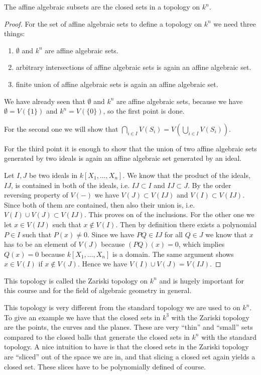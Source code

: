 \begin{proposition}
The affine algebraic subsets are the closed sets in a topology on $k^n$. 
\end{proposition}

\begin{proof}
For the set of affine algebraic sets to define a topology on $k^n$ we need three things:
\begin{enumerate}
    \item $\emptyset$ and $k^n$ are affine algebraic sets.
    \item arbitrary intersections of affine algebraic sets is again an affine algebraic set.
    \item finite union of affine algebraic sets is again an affine algebraic set. 
\end{enumerate}

We have already seen that $\emptyset$ and $k^n$ are affine algebraic sets, because we have $\emptyset = V(\{ 1\})$ and $k^n=V(\{0\})$, so the first point is done. 

For the second one we will show that $ \bigcap_{i\in I}V(S_i) = V(\bigcup_{i\in I}V(S_i))$. 

For the third point it is enough to show that the union of two affine algebraic sets generated by two ideals is again an affine algebraic set generated by an ideal.

Let $I, J$ be two ideals in $k[X_1, \ldots, X_n]$. We know that the product of the ideals, $IJ$, is contained in both of the ideals, i.e. $IJ\subset I$ and $IJ\subset J$. By the order reversing property of $V(-)$ we have $V(J)\subset V(IJ)$ and $V(I)\subset V(IJ)$. Since both of them are contained, then also their union is, i.e. $V(I)\cup V(J) \subset V(IJ)$. This proves on of the inclusions. For the other one we let $x\in V(IJ)$ such that $x\notin V(I)$. Then by definition there exists a polynomial $P\in I$ such that $P(x)\neq 0$. Since we have $PQ\in IJ$ for all $Q\in J$ we know that $x$ has to be an element of $V(J)$ because $(PQ)(x)=0$, which implies $Q(x)=0$ because $k[X_1, \ldots, X_n]$ is a domain. The same argument shows $x\in V(I)$ if $x\notin V(J)$. Hence we have $V(I)\cup V(J) = V(IJ)$. 
\end{proof}

This topology is called the Zariski topology on $k^n$ and is hugely important for this course and for the field of algebraic geometry in general. 

This topology is very different from the standard topology we are used to on $k^n$. To give an example we have that the closed sets in $k^3$ with the Zariski topology are the points, the curves and the planes. These are very ``thin'' and ``small'' sets compared to the closed balls that generate the closed sets in $k^n$ with the standard topology. A nice intuition to have is that the closed sets in the Zariski topology are ``sliced'' out of the space we are in, and that slicing a closed set again yields a closed set. These slices have to be polynomially defined of course. 

